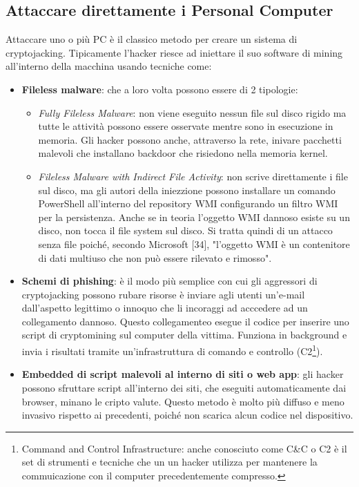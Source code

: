 \documentclass[12pt,a4paper]{article}
\begin{document}
\subsection{Attaccare direttamente i Personal Computer}
Attaccare uno o più PC è il classico metodo per creare un sistema di
cryptojacking. Tipicamente l'hacker riesce ad iniettare il suo software di
mining all'interno della macchina usando tecniche come:
\begin{itemize}
    \item \textbf{Fileless malware}: che a loro volta possono essere di 2 tipologie:
    \begin{itemize}
        \item \textit{Fully Fileless Malware}: non viene eseguito nessun file
        sul disco rigido ma tutte le attività possono essere osservate mentre
        sono in esecuzione in memoria. Gli hacker possono anche, attraverso la
        rete, inivare pacchetti malevoli che installano backdoor che risiedono
        nella memoria kernel.
        \item \textit{Fileless Malware with Indirect File Activity}: non scrive
        direttamente i file sul disco, ma gli autori della iniezzione possono
        installare un comando PowerShell all'interno del repository WMI
        configurando un filtro WMI per la persistenza. Anche se in teoria
        l'oggetto WMI dannoso esiste su un disco, non tocca il file system sul
        disco. Si tratta quindi di un attacco senza file poiché, secondo
        Microsoft [34], "l'oggetto WMI è un contenitore di dati multiuso che non
        può essere rilevato e rimosso".\cite{FMW}
    \end{itemize}
    \item \textbf{Schemi di phishing}: è il modo più semplice con cui gli
        aggressori di cryptojacking possono rubare risorse è inviare agli utenti
        un'e-mail dall'aspetto legittimo o innoquo che li incoraggi ad acccedere
        ad un collegamento dannoso. Questo collegamenteo esegue il codice per
        inserire uno script di cryptomining sul computer della vittima. Funziona
        in background e invia i risultati tramite un'infrastruttura di comando e
        controllo (C2\footnote{Command and Control Infrastructure: anche
        conosciuto come C\&C o C2 è il set di strumenti e tecniche che un un
        hacker utilizza per mantenere la commuicazione con il computer
        precedentemente compresso.}).
    \item \textbf{Embedded di script malevoli al interno di siti o web app}: gli
        hacker possono sfruttare script all'interno dei siti, che eseguiti
        automaticamente dai browser, minano le cripto valute. Questo metodo è
        molto più diffuso e meno invasivo rispetto ai precedenti, poiché non
        scarica alcun codice nel dispositivo.
\end{itemize}
\end{document}
